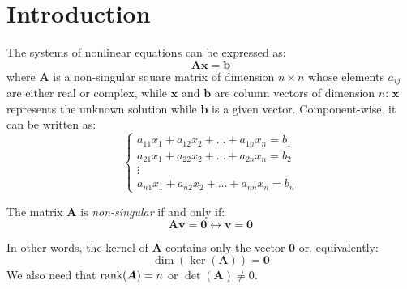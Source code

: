 \documentclass[12pt, a4paper]{report}
\newtheorem[style=M,bodystyle=\normalfont]{theorem}{Theorem}
\newtheorem[style=M,bodystyle=\normalfont]{proposition}{Proposition}
\newtheorem[style=M,bodystyle=\normalfont]{corollary}{Corollary}
\newtheorem[style=M,bodystyle=\normalfont]{lemma}{Lemma}
\newtheorem[style=M,bodystyle=\normalfont]{definition}{Definition}
\begin{document}
    \section{Introduction}
    The systems of nonlinear equations can be expressed as: 
    \[\boldsymbol{Ax}=\boldsymbol{b}\]
    where $\boldsymbol{A}$ is a non-singular square matrix of dimension $n \times n$ whose elements $a_{ij}$ are either real or complex, while $\boldsymbol{x}$ and $\boldsymbol{b}$ are column vectors of dimension $n$: 
    $\boldsymbol{x}$ represents the unknown solution while $\boldsymbol{b}$ is a given vector. Component-wise, it can be written as: 
    \[
    \begin{cases}
        a_{11}x_1+a_{12}x_2+\dots+a_{1n}x_n=b_1 \\
        a_{21}x_1+a_{22}x_2+\dots+a_{2n}x_n=b_2 \\
        \vdots                                  \\
        a_{n1}x_1+a_{n2}x_2+\dots+a_{nn}x_n=b_n
    \end{cases}
    \]
    \begin{definition}
        The matrix $\boldsymbol{A}$ is \emph{non-singular} if and only if: 
        \[\boldsymbol{Av}=\boldsymbol{0}\leftrightarrow\boldsymbol{v}=\boldsymbol{0}\]
    \end{definition}
    In other words, the kernel of $\boldsymbol{A}$ contains only the vector $\boldsymbol{0}$ or, equivalently: 
    \[\dim{\left(\ker{\left(\boldsymbol{A}\right)}\right)}=\boldsymbol{0}\]
    We also need that $\textnormal{rank}(\boldsymbol{A})=n$ or $\det(\boldsymbol{A})\neq 0$. 
\end{document}
